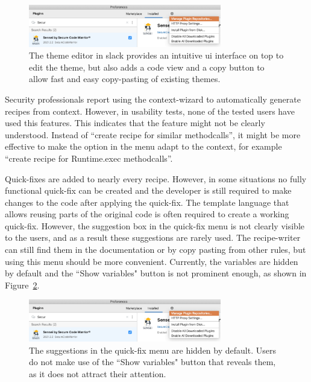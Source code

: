 \begin{figure}
  \centering
  \includegraphics[width=0.75\textwidth,page=16]{04-tools/figures/figures2.pdf}
  
  \caption[Slack theme editor]{The theme editor in slack provides an intuitive \gls{ui} interface on top to edit the theme, but also adds a code view and a copy button to allow fast and easy copy-pasting of existing themes.}
  \label{fig:slacktheme} 
\end{figure}

Security professionals report using the context-wizard to automatically generate recipes from context.
However, in usability tests, none of the tested users have used this features.
This indicates that the feature might not be clearly understood.
Instead of “create recipe for similar methodcalls”, it might be more effective to make the option in the menu adapt to the context, for example “create recipe for Runtime.exec methodcalls”.

Quick-fixes are added to nearly every recipe.
However, in some situations no fully functional quick-fix can be created and the developer is still required to make changes to the code after applying the quick-fix.
The template language that allows reusing parts of the original code is often required to create a working quick-fix.
However, the suggestion box in the quick-fix menu is not clearly visible to the users, and as a result these suggestions are rarely used.
The recipe-writer can still find them in the documentation or by copy pasting from other rules, but using this menu should be more convenient.
Currently, the variables are hidden by default and the ``Show variables" button is not prominent enough, as shown in Figure~\ref{fig:showvariables}.

\begin{figure}
  \centering
  \includegraphics[width=0.75\textwidth,page=15]{04-tools/figures/figures2.pdf}
  \caption[Show variables button in the fix menu]{The suggestions in the quick-fix menu are hidden by default. Users do not make use of the ``Show variables" button that reveals them, as it does not attract their attention.}
  \label{fig:showvariables} 
\end{figure}


